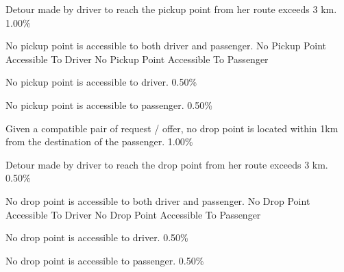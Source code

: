   \startkaosspec
  	 {Detour made by driver to reach the pickup point from her route exceeds 3 km.}
  	 {1.00\%}
  \stopkaosspec
  
  \startkaosspec
  	 {No pickup point is accessible to both driver and passenger.}
  	 {No Pickup Point Accessible To Driver}
  	 {No Pickup Point Accessible To Passenger}
  \stopkaosspec
  
  \startkaosspec
  	 {No pickup point is accessible to driver.}
  	 {0.50\%}
  \stopkaosspec
  
  \startkaosspec
  	 {No pickup point is accessible to passenger.}
  	 {0.50\%}
  \stopkaosspec
  
  \startkaosspec
  	 {Given a compatible pair of request / offer, no drop point is located within 1km from the destination of the passenger.}
  	 {1.00\%}
  \stopkaosspec
  
  \startkaosspec
  	 {Detour made by driver to reach the drop point from her route exceeds 3 km.}
  	 {0.50\%}
  \stopkaosspec
  
  \startkaosspec
  	 {No drop point is accessible to both driver and passenger.}
  	 {No Drop Point Accessible To Driver}
  	 {No Drop Point Accessible To Passenger}
  \stopkaosspec
  
  \startkaosspec
  	 {No drop point is accessible to driver.}
  	 {0.50\%}
  \stopkaosspec
  
  \startkaosspec
  	 {No drop point is accessible to passenger.}
  	 {0.50\%}
  \stopkaosspec
  
    

